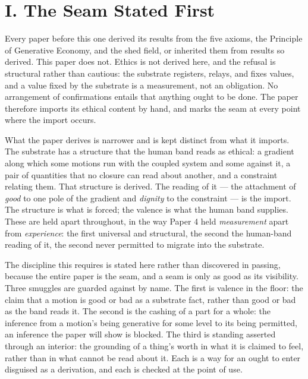 \documentclass[11pt,oneside]{report}
\theoremstyle{definition}
\theoremstyle{remark}
\begin{document}
\section*{I. The Seam Stated First}

Every paper before this one derived its results from the five axioms, the Principle of Generative Economy, and the shed field, or inherited them from results so derived. This paper does not. Ethics is not derived here, and the refusal is structural rather than cautious: the substrate registers, relays, and fixes values, and a value fixed by the substrate is a measurement, not an obligation. No arrangement of confirmations entails that anything ought to be done. The paper therefore imports its ethical content by hand, and marks the seam at every point where the import occurs.

What the paper derives is narrower and is kept distinct from what it imports. The substrate has a structure that the human band reads as ethical: a gradient along which some motions run with the coupled system and some against it, a pair of quantities that no closure can read about another, and a constraint relating them. That structure is derived. The reading of it --- the attachment of \emph{good} to one pole of the gradient and \emph{dignity} to the constraint --- is the import. The structure is what is forced; the valence is what the human band supplies. These are held apart throughout, in the way Paper 4 held \emph{measurement} apart from \emph{experience}: the first universal and structural, the second the human-band reading of it, the second never permitted to migrate into the substrate.

The discipline this requires is stated here rather than discovered in passing, because the entire paper is the seam, and a seam is only as good as its visibility. Three smuggles are guarded against by name. The first is valence in the floor: the claim that a motion is good or bad as a substrate fact, rather than good or bad as the band reads it. The second is the cashing of a part for a whole: the inference from a motion's being generative for some level to its being permitted, an inference the paper will show is blocked. The third is standing asserted through an interior: the grounding of a thing's worth in what it is claimed to feel, rather than in what cannot be read about it. Each is a way for an ought to enter disguised as a derivation, and each is checked at the point of use.
\end{document}
